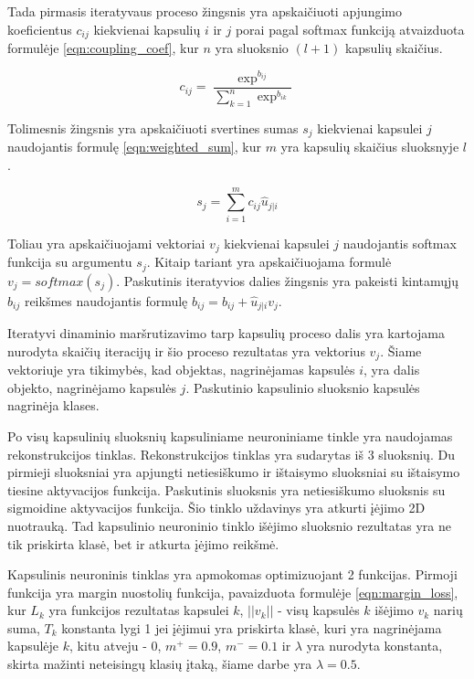 Tada pirmasis iteratyvaus proceso žingsnis yra apskaičiuoti apjungimo koeficientus $c_{ij}$ kiekvienai kapsulių $i$ ir $j$ porai pagal softmax funkciją atvaizduota formulėje \ref{eqn:coupling_coef}, kur $n$ yra sluoksnio $(l + 1)$ kapsulių skaičius.

\begin{equation}
\label{eqn:coupling_coef}
	c_{ij} = \dfrac{\exp^{b_{ij}}}{\sum_{k = 1}^{n} \exp^{b_{ik}}}
\end{equation}

Tolimesnis žingsnis yra apskaičiuoti svertines sumas $s_j$ kiekvienai kapsulei $j$ naudojantis formulę \ref{eqn:weighted_sum}, kur $m$ yra kapsulių skaičius sluoksnyje $l$.

\begin{equation}
\label{eqn:weighted_sum}
	s_{j} = \sum_{i = 1}^{m} c_{ij} \hat{u}_{j|i}
\end{equation}

Toliau yra apskaičiuojami vektoriai $v_j$ kiekvienai kapsulei $j$ naudojantis softmax funkcija su argumentu $s_j$. Kitaip tariant yra apskaičiuojama formulė $v_j = softmax(s_j)$. Paskutinis iteratyvios dalies žingsnis yra pakeisti kintamųjų $b_{ij}$ reikšmes naudojantis formulę $b_{ij} = b_{ij} + \hat{u}_{j|i} v_j$.

Iteratyvi dinaminio maršrutizavimo tarp kapsulių proceso dalis yra kartojama nurodyta skaičių iteracijų ir šio proceso rezultatas yra vektorius $v_j$. Šiame vektoriuje yra tikimybės, kad objektas, nagrinėjamas kapsulės $i$, yra dalis objekto, nagrinėjamo kapsulės $j$. Paskutinio kapsulinio sluoksnio kapsulės nagrinėja klases.

Po visų kapsulinių sluoksnių kapsuliniame neuroniniame tinkle yra naudojamas rekonstrukcijos tinklas. Rekonstrukcijos tinklas yra sudarytas iš 3 sluoksnių. Du pirmieji sluoksniai yra apjungti netiesiškumo ir ištaisymo sluoksniai su ištaisymo tiesine aktyvacijos funkcija. Paskutinis sluoksnis yra netiesiškumo sluoksnis  su sigmoidine aktyvacijos funkcija. Šio tinklo uždavinys yra atkurti įėjimo 2D nuotrauką. Tad kapsulinio neuroninio tinklo išėjimo sluoksnio rezultatas yra ne tik priskirta klasė, bet ir atkurta įėjimo reikšmė.

Kapsulinis neuroninis tinklas yra apmokomas optimizuojant 2 funkcijas. Pirmoji funkcija yra margin nuostolių funkcija, pavaizduota formulėje \ref{eqn:margin_loss}, kur $L_k$ yra funkcijos rezultatas kapsulei $k$, $||v_k||$ - visų kapsulės $k$ išėjimo $v_k$ narių suma, $T_k$ konstanta lygi 1 jei įėjimui yra priskirta klasė, kuri yra nagrinėjama kapsulėje $k$, kitu atveju - 0, $m^+ = 0.9$, $m^- = 0.1$ ir $\lambda$ yra nurodyta konstanta, skirta mažinti neteisingų klasių įtaką, šiame darbe yra $\lambda = 0.5$.

